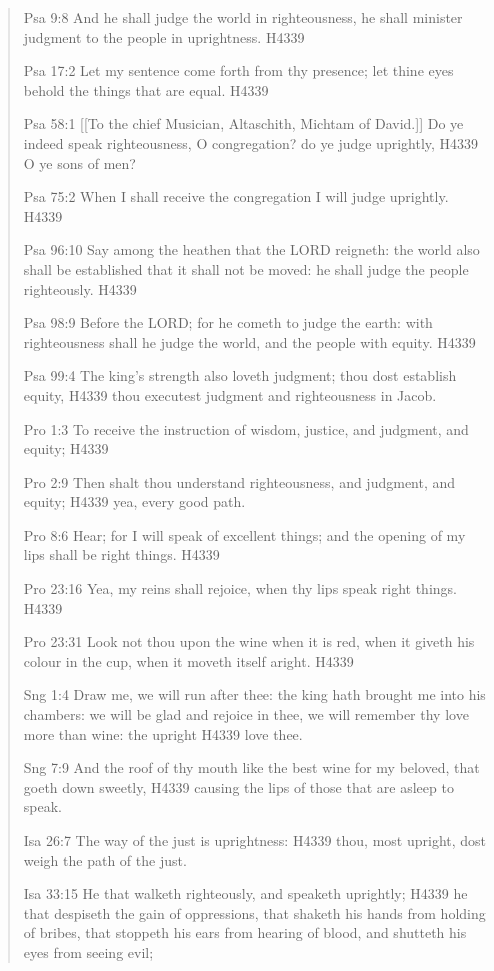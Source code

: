 \documentclass[11pt]{article}
\begin{document}
\begin{thebibliography}{37}
\begin{quote}
Psa 9:8
And he shall judge the world in righteousness, he shall minister judgment to the people in uprightness. H4339

Psa 17:2
Let my sentence come forth from thy presence; let thine eyes behold the things that are equal. H4339

Psa 58:1
[[To the chief Musician, Altaschith, Michtam of David.]] Do ye indeed speak righteousness, O congregation? do ye judge uprightly, H4339 O ye sons of men?

Psa 75:2
When I shall receive the congregation I will judge uprightly. H4339

Psa 96:10
Say among the heathen that the LORD reigneth: the world also shall be established that it shall not be moved: he shall judge the people righteously. H4339

Psa 98:9
Before the LORD; for he cometh to judge the earth: with righteousness shall he judge the world, and the people with equity. H4339

Psa 99:4
The king's strength also loveth judgment; thou dost establish equity, H4339 thou executest judgment and righteousness in Jacob.

Pro 1:3
To receive the instruction of wisdom, justice, and judgment, and equity; H4339

Pro 2:9
Then shalt thou understand righteousness, and judgment, and equity; H4339 yea, every good path.

Pro 8:6
Hear; for I will speak of excellent things; and the opening of my lips shall be right things. H4339

Pro 23:16
Yea, my reins shall rejoice, when thy lips speak right things. H4339

Pro 23:31
Look not thou upon the wine when it is red, when it giveth his colour in the cup, when it moveth itself aright. H4339

Sng 1:4
Draw me, we will run after thee: the king hath brought me into his chambers: we will be glad and rejoice in thee, we will remember thy love more than wine: the upright H4339 love thee.

Sng 7:9
And the roof of thy mouth like the best wine for my beloved, that goeth down sweetly, H4339 causing the lips of those that are asleep to speak.

Isa 26:7
The way of the just is uprightness: H4339 thou, most upright, dost weigh the path of the just.

Isa 33:15
He that walketh righteously, and speaketh uprightly; H4339 he that despiseth the gain of oppressions, that shaketh his hands from holding of bribes, that stoppeth his ears from hearing of blood, and shutteth his eyes from seeing evil;


\end{quote}
\end{thebibliography}
\end{document}
